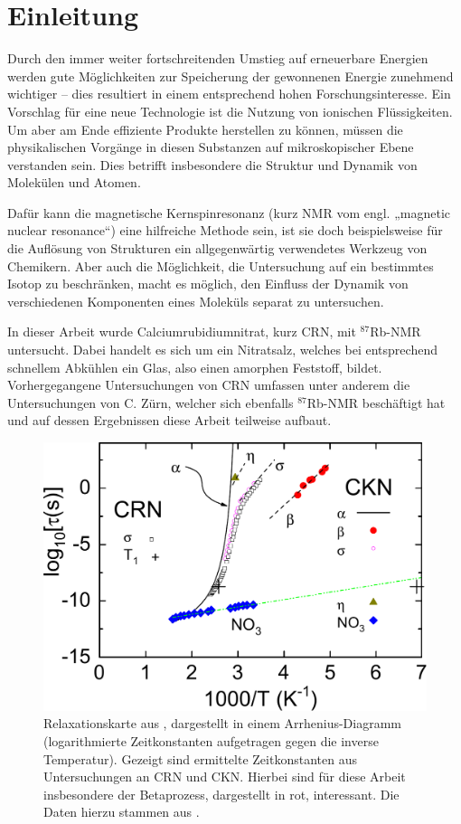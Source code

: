 \chapter{Einleitung}


Durch den immer weiter fortschreitenden Umstieg auf erneuerbare Energien werden gute Möglichkeiten zur Speicherung der gewonnenen Energie zunehmend wichtiger -- dies resultiert in einem entsprechend hohen Forschungsinteresse. Ein Vorschlag für eine neue Technologie ist die Nutzung von ionischen Flüssigkeiten. Um aber am Ende effiziente Produkte herstellen zu können, müssen die physikalischen Vorgänge in diesen Substanzen auf mikroskopischer Ebene verstanden sein. Dies betrifft insbesondere die Struktur und Dynamik von Molekülen und Atomen. 

Dafür kann die magnetische Kernspinresonanz (kurz NMR vom engl. „magnetic nuclear resonance“) eine hilfreiche Methode sein, ist sie doch beispielsweise für die Auflösung von Strukturen ein allgegenwärtig verwendetes Werkzeug von Chemikern. Aber auch die Möglichkeit, die Untersuchung auf ein bestimmtes Isotop zu beschränken, macht es möglich, den Einfluss der Dynamik von verschiedenen Komponenten eines Moleküls separat zu untersuchen.

In dieser Arbeit wurde Calciumrubidiumnitrat, kurz CRN, mit $^\text{87}$Rb-NMR untersucht. Dabei handelt es sich um ein Nitratsalz, welches bei entsprechend schnellem Abkühlen ein Glas, also einen amorphen Feststoff, bildet. Vorhergegangene Untersuchungen von CRN umfassen unter anderem die Untersuchungen von C. Zürn, welcher sich ebenfalls $^\text{87}$Rb-NMR beschäftigt hat \cite{zuern_paper} und auf dessen Ergebnissen diese Arbeit teilweise aufbaut.
\begin{figure}
	\begin{center}
		\includegraphics[width=.7\textwidth]{graphics/zuern/Plot1_b.pdf}
	\end{center}
	\caption{Relaxationskarte aus \cite{zuern_paper}, dargestellt in einem Arrhenius-Diagramm (logarithmierte Zeitkonstanten aufgetragen gegen die inverse Temperatur). Gezeigt sind ermittelte Zeitkonstanten aus Untersuchungen an CRN und CKN. Hierbei sind für diese Arbeit insbesondere der Betaprozess, dargestellt in rot, interessant. Die Daten hierzu stammen aus \cite{johari_beta}.} \label{fig:einl:zuernpaper}
\end{figure}

